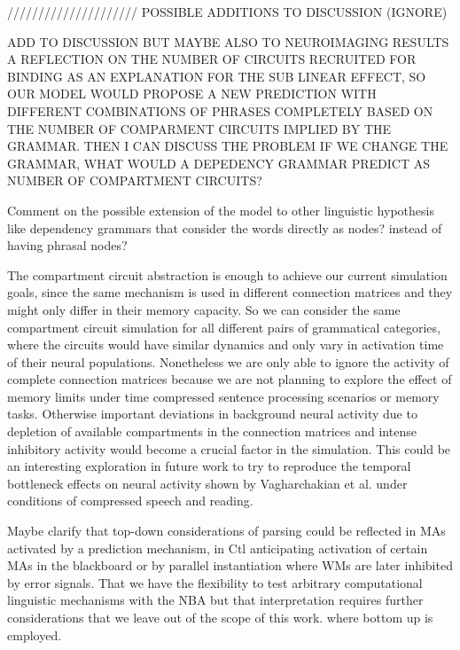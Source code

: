 \documentclass[10pt]{article}
\newcommand{\noteCP}[1]{}
\begin{document}
///////////////////// POSSIBLE ADDITIONS TO DISCUSSION (IGNORE)

ADD TO DISCUSSION BUT MAYBE ALSO TO NEUROIMAGING RESULTS A REFLECTION ON THE NUMBER OF CIRCUITS RECRUITED FOR BINDING AS AN EXPLANATION FOR THE SUB LINEAR EFFECT, SO OUR MODEL WOULD PROPOSE A NEW PREDICTION WITH DIFFERENT COMBINATIONS OF PHRASES COMPLETELY BASED ON THE NUMBER OF COMPARMENT CIRCUITS IMPLIED BY THE GRAMMAR. THEN I CAN DISCUSS THE PROBLEM IF WE CHANGE THE GRAMMAR, WHAT WOULD A DEPEDENCY GRAMMAR PREDICT AS NUMBER OF COMPARTMENT CIRCUITS?


Comment on the possible extension of the model to other linguistic hypothesis like dependency grammars that consider the words directly as nodes? instead of having phrasal nodes?


The compartment circuit abstraction is enough to achieve our current simulation goals\noteCP{Would be nice to list them early in the paper.}, since the same mechanism is used in different connection matrices and they might only differ in their memory capacity.
So we can consider the same compartment circuit simulation for all different pairs of grammatical categories, where the circuits would have similar dynamics and only vary in activation time of their neural populations.
Nonetheless we are only able to ignore the activity of complete connection matrices because we are not planning to explore the effect of memory limits under time compressed sentence processing scenarios or memory tasks.
Otherwise important deviations in background neural activity due to depletion of available compartments in the connection matrices and intense inhibitory activity would become a crucial factor in the simulation.
This could be an interesting exploration in future work to try to reproduce the temporal bottleneck effects on neural activity shown by Vagharchakian et al. under conditions of compressed speech and reading\cite{Vagharchakian_2012}.\noteCP{Maybe this should be part of the final discussion rather than here where it may divert attention.}


Maybe clarify that top-down considerations of parsing could be reflected in MAs activated by a prediction mechanism, in Ctl anticipating activation of certain MAs in the blackboard or by parallel instantiation where WMs are later inhibited by error signals.
That we have the flexibility to test arbitrary computational linguistic mechanisms with the NBA but that interpretation requires further considerations that we leave out of the scope of this work.
where bottom up is employed.
\end{document}

